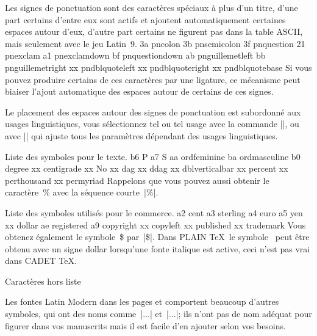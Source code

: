 Les signes de ponctuation sont des caractères spéciaux à plus d'un
titre, d'une part certains d'entre eux sont actifs et ajoutent
automatiquement certaines espaces autour d'eux, d'autre part certains
ne figurent pas dans la table ASCII, mais seulement avec le jeu
Latin~9.
\beginchartable
3a pncolon
3b pnsemicolon
3f pnquestion
21 pnexclam
a1 pnexclamdown
bf pnquestiondown
ab pnguillemetleft
bb pnguillemetright
xx pndblquoteleft
xx pndblquoteright
xx pndblquotebase
\endchartable
Si vous pouvez produire certains de ces caractères par une ligature,
ce mécanisme peut biaiser l'ajout automatique des espaces autour de
certains de ces signes.

Le placement des espaces autour des signes de ponctuation est
subordonné aux usages linguistiques, vous sélectionnez tel ou tel
usage avec la commande ||, ou avec
|| qui ajuste tous les paramètres dépendant des
usages linguistiques.

\smallskip
Liste des symboles pour le texte.
\beginchartable
b6 P
a7 S
aa ordfeminine
ba ordmasculine
b0 degree
xx centigrade
xx No
xx dag
xx ddag
xx dblverticalbar
xx percent
xx perthousand
xx permyriad
\endchartable
Rappelons que vous pouvez aussi obtenir le caractère~\% avec la
séquence courte~|\%|.


\smallskip
Liste des symboles utilisés pour le commerce.
\beginchartable
a2 cent
a3 sterling
a4 euro
a5 yen
xx dollar
ae registered
a9 copyright
xx copyleft
xx published
xx trademark
\endchartable
Vous obtenez également le symbole~\$ par~|\$|. Dans PLAIN \TeX\ le
symbole \sterling\ peut être obtenu avec un signe dollar lorsqu'une
fonte italique est active, ceci n'est pas vrai dans CADET \TeX.


\formalpar Caractères hors liste

Les fontes Latin Modern dans les pages  et  comportent
beaucoup d'autres symboles, qui ont des noms comme~|\tl...|
et~|\ts...|; ils n'ont pas de nom adéquat pour figurer dans vos
manuscrits mais il est facile d'en ajouter selon vos besoins.

